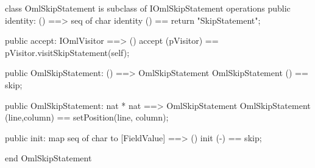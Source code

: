 \begin{vdm_al}
class OmlSkipStatement is subclass of IOmlSkipStatement
operations
  public identity: () ==> seq of char
  identity () == return "SkipStatement";

  public accept: IOmlVisitor ==> ()
  accept (pVisitor) == pVisitor.visitSkipStatement(self);

  public OmlSkipStatement:
    () ==> OmlSkipStatement
  OmlSkipStatement () == 
    skip;

  public OmlSkipStatement:
    nat *
    nat ==> OmlSkipStatement
  OmlSkipStatement (line,column) == 
    setPosition(line, column);

  public init: map seq of char to [FieldValue] ==> ()
  init (-) == skip;

end OmlSkipStatement
\end{vdm_al}


